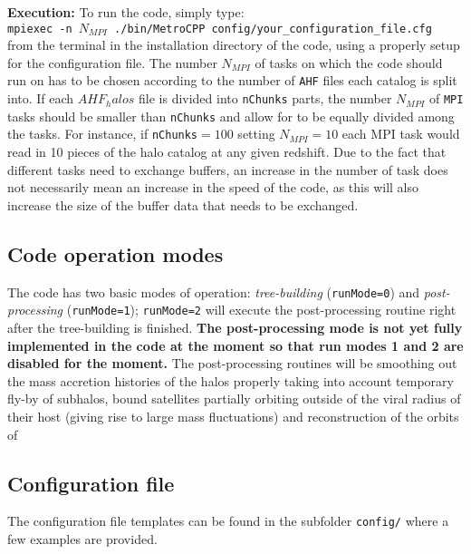 \documentclass{article}
\begin{document}
\textbf{Execution:}
To run the code, simply type:\\

\texttt{mpiexec -n $N_{MPI}$ ./bin/MetroCPP config/your\_configuration\_file.cfg}\\

\noindent
from the terminal in the installation directory of the code, using a properly setup for the configuration file.
The number $N_{MPI}$ of tasks on which the code should run on has to be chosen according to the number of \texttt{AHF} files each catalog
is split into. If each $AHF_halos$ file is divided into \texttt{nChunks} parts, the number $N_{MPI}$ 
of \texttt{MPI} tasks should be smaller than \texttt{nChunks} and allow for to be equally divided among the tasks.
For instance, if \texttt{nChunks}$=100$ setting $N_{MPI} = 10$ each MPI task would read in 10 pieces of the 
halo catalog at any given redshift.
Due to the fact that different tasks need to exchange buffers, an increase in the number of task does not necessarily mean
an increase in the speed of the code, as this will also increase the size of the buffer data that needs to be exchanged.



\subsection{Code operation modes}

The code has two basic modes of operation: \emph{tree-building} (\texttt{runMode=0}) and \emph{post-processing}
(\texttt{runMode=1}); \texttt{runMode=2} will execute the post-processing routine right after the tree-building is finished.
\textbf{The post-processing mode is not yet fully implemented in the code at the moment so that run modes 1 and 2 are disabled 
for the moment.} The post-processing routines will be smoothing out the mass accretion histories of the halos properly taking into 
account temporary fly-by of subhalos, bound satellites partially orbiting outside of the viral radius of their host (giving rise
to large mass fluctuations) and reconstruction of the orbits of 


\subsection{Configuration file}

The configuration file templates can be found in the subfolder \texttt{config/} where a few examples are provided. 
\end{document}
